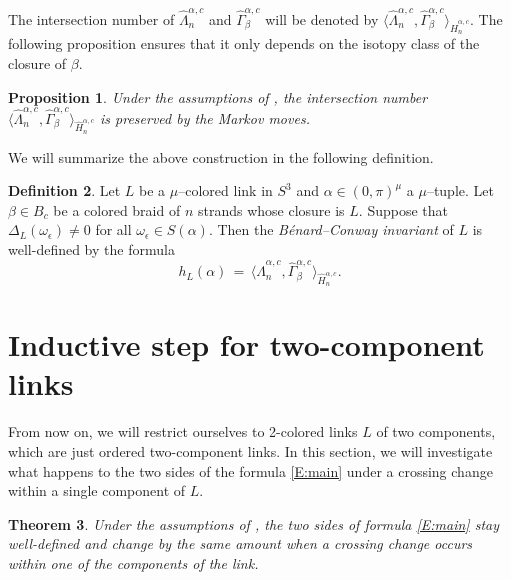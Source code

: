 \documentclass[11pt,reqno]{amsart}
\newtheorem{theorem}{Theorem}[section]
\newtheorem{proposition}[theorem]{Proposition}
\theoremstyle{definition}
\newtheorem{definition}[theorem]{Definition}
\begin{document}
\begin{sloppypar}
The intersection number of $\widehat{\Lambda}_n^{\alpha, c}$ and $\widehat{\Gamma}_{\beta}^{\alpha,c}$ will be denoted by $\big\langle\widehat{\Lambda}_n^{\alpha, c}, \widehat{\Gamma}_{\beta}^{\alpha,c}\big\rangle_{\widehat{H}_n^{\alpha, c}}$. The following proposition ensures that it only depends on the isotopy class of the closure of $\beta$.
		
\begin{proposition}
Under the assumptions of , the intersection number $\big\langle \widehat{\Lambda}_n^{\alpha, c}, \widehat{\Gamma}_{\beta}^{\alpha,c}\big\rangle_{\widehat{H}_n^{\alpha, c}}$ is preserved by the Markov moves.
\end{proposition}
		
We will summarize the above construction in the following definition. 	
	
\begin{definition}
Let $L$ be a $\mu$--colored link in $S^3$ and $\alpha \in (0, \pi)^{\mu}$ a $\mu$--tuple. Let $\beta \in B_c$ be a colored braid of $n$ strands whose closure is $L$. Suppose that $\Delta_L(\omega_{\epsilon}) \ne 0$ for all $\omega_{\epsilon} \in S(\alpha)$. Then the \textit{Bénard--Conway invariant} of $L$ is well-defined by the formula
\begin{equation}\label{E:def}
h_L(\alpha)\, =\, \big\langle \widehat{\Lambda}_n^{\alpha, c}, \widehat{\Gamma}_{\beta}^{\alpha,c}\big\rangle_{\widehat{H}_n^{\alpha, c}}.
\end{equation}
\end{definition}
		
		
\section{Inductive step for two-component links}\label{sec:induction}
From now on, we will restrict ourselves to 2-colored links $L$ of two components, which are just ordered two-component links. In this section, we will investigate what happens to the two sides of the formula \eqref{E:main} under a crossing change within a single component of $L$. 

\begin{theorem}
Under the assumptions of , the two sides of formula \eqref{E:main} stay well-defined and change by the same amount when a crossing change occurs within one of the components of the link.
\end{theorem}


\end{sloppypar}
\end{document}

